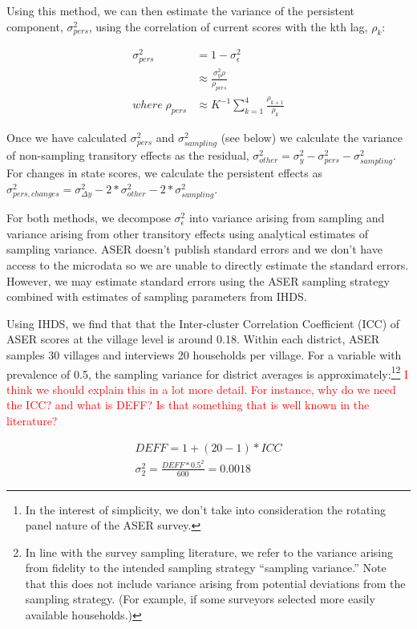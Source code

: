 \documentclass[
  11pt,
]{article}
\begin{document}
Using this method, we can then estimate the variance of the persistent component, \(\sigma^2_{pers}\), using the correlation of current scores with the kth lag, \(\rho_{k}\):

\[
\begin{aligned}
  \sigma^2_{pers} &= 1 - \sigma^2_{\epsilon} \\
  &\approx \frac{\sigma^2_{y}\rho}{\rho_{pers}} \\
  where \; \rho_{pers}  &\approx K^{-1}\sum_{k=1}^4\frac{\rho_{k+1}}{\rho_k}
\end{aligned}
\]

Once we have calculated \(\sigma^2_{pers}\) and \(\sigma^2_{sampling}\) (see below) we calculate the variance of non-sampling transitory effects as the residual, \(\sigma^2_{other} = \sigma^2_{y} - \sigma^2_{pers} - \sigma^2_{sampling}\). For changes in state scores, we calculate the persistent effects as \(\sigma^2_{pers,changes} = \sigma^2_{\Delta y}-2*\sigma^2_{other}-2*\sigma^2_{sampling}\).

For both methods, we decompose \(\sigma^2_{\epsilon}\) into variance arising from sampling and variance arising from other transitory effects using analytical estimates of sampling variance. ASER doesn't publish standard errors and we don't have access to the microdata so we are unable to directly estimate the standard errors. However, we may estimate standard errors using the ASER sampling strategy combined with estimates of sampling parameters from IHDS.

Using IHDS, we find that that the Inter-cluster Correlation Coefficient (ICC) of ASER scores at the village level is around 0.18. Within each district, ASER samples 30 villages and interviews 20 households per village. For a variable with prevalence of 0.5, the sampling variance for district averages is approximately:\footnote{In the interest of simplicity, we don't take into consideration the rotating panel nature of the ASER survey.}\footnote{In line with the survey sampling literature, we refer to the variance arising from fidelity to the intended sampling strategy ``sampling variance.'' Note that this does not include variance arising from potential deviations from the sampling strategy. (For example, if some surveyors selected more easily available households.)} \textcolor{red}{I think we should explain this in a lot more detail. For instance, why do we need the ICC? and what is DEFF? Is that something that is well known in the literature?}

\[
\begin{aligned}
  DEFF = 1 + (20 - 1)*ICC \\
  \sigma^2_{2} = \frac{DEFF*0.5^2}{600} = 0.0018
\end{aligned}
\]
\end{document}
